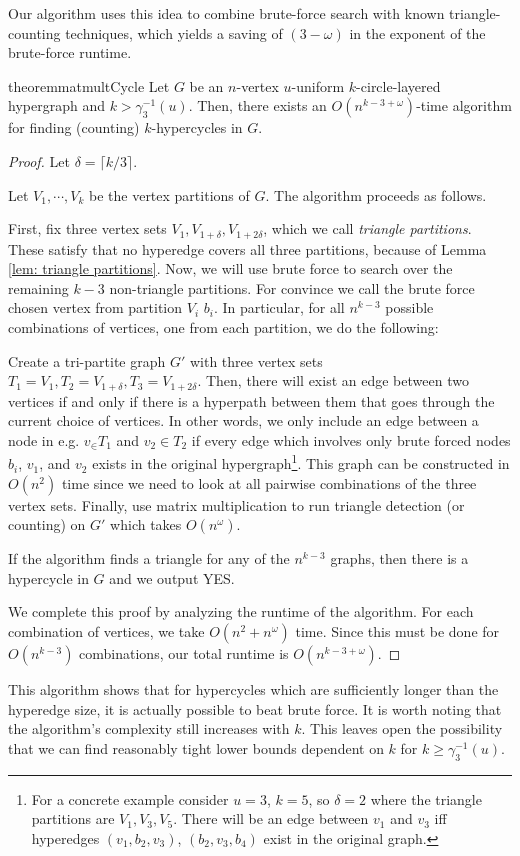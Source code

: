 \documentclass[11pt,letterpaper,pdftex]{article}
\begin{document}
Our algorithm uses this idea to combine brute-force search with known triangle-counting techniques, which yields a saving of $(3-\omega)$ in the exponent of the brute-force runtime.


\begin{restatable}{theorem}{matmultCycle} \label{thm: matmul_cycle}
    Let $G$ be an $n$-vertex $u$-uniform $k$-circle-layered hypergraph and $k > \gamma^{-1}_3(u)$.
    Then, there exists an $O(n^{k-3+\omega})$-time algorithm for finding (counting) $k$-hypercycles in $G$.
\end{restatable}


\begin{proof}

    Let $\delta = \lceil k/3 \rceil$.
    
    Let $V_1, \cdots, V_k$ be the vertex partitions of $G$.
    The algorithm proceeds as follows.

    First, fix three vertex sets $V_1,V_{1+\delta},V_{1+2\delta}$, which we call \textit{triangle partitions}.
    These satisfy that no hyperedge covers all three partitions, because of Lemma \ref{lem: triangle partitions}.
    Now, we will use brute force to search over the remaining $k-3$ non-triangle partitions. For convince we call the brute force chosen vertex from partition $V_i$ $b_i$.
    In particular, for all $n^{k-3}$ possible combinations of vertices, one from each partition, we do the following:
    
    Create a tri-partite graph $G'$ with three vertex sets $T_1=V_1,T_2=V_{1+\delta},T_3=V_{1+2\delta}$.
    Then, there will exist an edge between two vertices if and only if there is a hyperpath between them that goes through the current choice of vertices. In other words, we only include an edge between a node in e.g. $v_ \in T_1$ and $v_2 \in T_2$ if every edge which involves only brute forced nodes $b_i$, $v_1$, and $v_2$ exists in the original hypergraph\footnote{For a concrete example consider $u=3$, $k=5$, so $\delta = 2$ where the triangle partitions are $V_1, V_3, V_5$. There will be an edge between $v_1$ and $v_3$ iff hyperedges $(v_1,b_2,v_3)$, $(b_2,v_3,b_4)$ exist in the original graph.}.
    This graph can be constructed in $O(n^2)$ time since we need to look at all pairwise combinations of the three vertex sets.
    Finally, use matrix multiplication to run triangle detection (or counting) on $G'$ which takes $O(n^{\omega})$. 

    If the algorithm finds a triangle for any of the $n^{k-3}$ graphs, then there is a hypercycle in $G$ and we output YES.

    We complete this proof by analyzing the runtime of the algorithm.
    For each combination of vertices, we take $O(n^2+n^{\omega})$ time.
    Since this must be done for $O(n^{k-3})$ combinations, our total runtime is $O(n^{k-3+\omega})$.
\end{proof}
This algorithm shows that for hypercycles which are sufficiently longer than the hyperedge size, it is actually possible to beat brute force.
It is worth noting that the algorithm's complexity still increases with $k$.
This leaves open the possibility that we can find reasonably tight lower bounds dependent on $k$ for $k \geq \gamma^{-1}_3(u)$.
\end{document}
